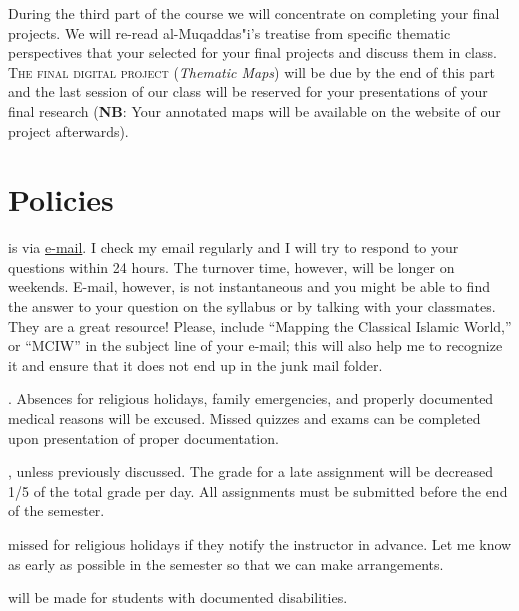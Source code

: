 \documentclass{tufte-handout} %
\begin{document}
During the third part of the course we will concentrate on completing your final projects. We will re-read al-Muqaddas"i's treatise from specific thematic perspectives that your selected for your final projects and discuss them in class. \textsc{The final digital project} (\textit{Thematic Maps}) will be due by the end of this part and the last session of our class will be reserved for your presentations of your final research (\textbf{NB}: Your annotated maps will be available on the website of our project afterwards).

\newpage
\section{Policies}

 is via \href{maxim.romanov@tufts.edu}{e-mail}. I check my email regularly and I will try to respond to your questions within 24 hours. The turnover time, however, will be longer on weekends. E-mail, however, is not instantaneous and you might be able to find the answer to your question on the syllabus or by talking with your classmates. They are a great resource! Please, include ``Mapping the Classical Islamic World,'' or ``MCIW'' in the subject line of your e-mail; this will also help me to recognize it and ensure that it does not end up in the junk mail folder.

. Absences for religious holidays, family emergencies, and properly documented medical reasons will be excused. Missed quizzes and exams can be completed upon presentation of proper documentation. 

, unless previously discussed. The grade for a late assignment will be decreased 1/5 of the total grade per day. All assignments must be submitted before the end of the semester.

 missed for religious holidays if they notify the instructor in advance. Let me know as early as possible in the semester so that we can make arrangements.

 will be made for students with documented disabilities.
\end{document}
